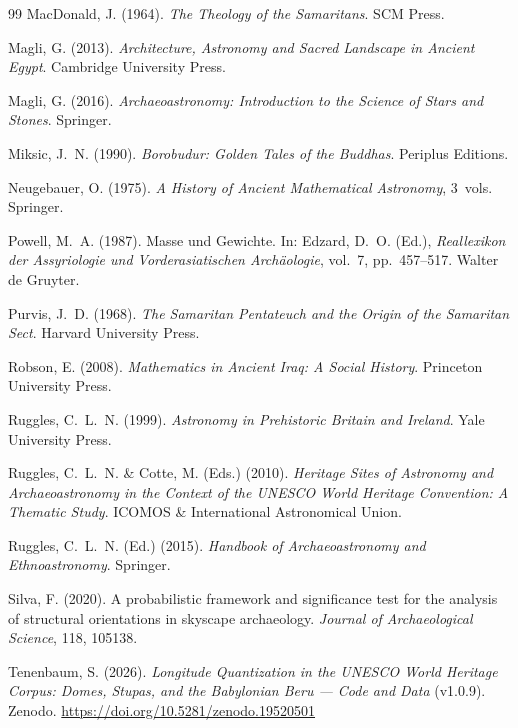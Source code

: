 \documentclass[HARVARD,twocolumn]{USG}
\begin{document}
\begin{thebibliography}{99}
MacDonald, J. (1964).
\textit{The Theology of the Samaritans}.
SCM Press.

Magli, G. (2013).
\textit{Architecture, Astronomy and Sacred Landscape in Ancient Egypt}.
Cambridge University Press.

Magli, G. (2016).
\textit{Archaeoastronomy: Introduction to the Science of Stars and Stones}.
Springer.

Miksic, J.~N. (1990).
\textit{Borobudur: Golden Tales of the Buddhas}.
Periplus Editions.

Neugebauer, O. (1975).
\textit{A History of Ancient Mathematical Astronomy}, 3~vols.
Springer.

Powell, M.~A. (1987).
Masse und Gewichte.
In: Edzard, D.~O. (Ed.),
\textit{Reallexikon der Assyriologie und Vorderasiatischen Arch\"aologie},
vol.~7, pp.~457--517. Walter de Gruyter.

Purvis, J.~D. (1968).
\textit{The Samaritan Pentateuch and the Origin of the Samaritan Sect}.
Harvard University Press.

Robson, E. (2008).
\textit{Mathematics in Ancient Iraq: A Social History}.
Princeton University Press.

Ruggles, C.~L.~N. (1999).
\textit{Astronomy in Prehistoric Britain and Ireland}.
Yale University Press.

Ruggles, C.~L.~N. \& Cotte, M. (Eds.) (2010).
\textit{Heritage Sites of Astronomy and Archaeoastronomy in the Context
of the UNESCO World Heritage Convention: A Thematic Study}.
ICOMOS \& International Astronomical Union.

Ruggles, C.~L.~N. (Ed.) (2015).
\textit{Handbook of Archaeoastronomy and Ethnoastronomy}.
Springer.

Silva, F. (2020).
A probabilistic framework and significance test for the analysis
of structural orientations in skyscape archaeology.
\textit{Journal of Archaeological Science}, 118, 105138.

Tenenbaum, S. (2026).
\textit{Longitude Quantization in the UNESCO World Heritage Corpus: Domes, Stupas, and the Babylonian Beru --- Code and Data} (v1.0.9).
Zenodo. \url{https://doi.org/10.5281/zenodo.19520501}


\end{thebibliography}
\end{document}
